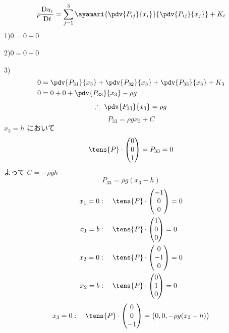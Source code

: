 \[ \rho\frac{\mathrm{D}u_{i}}{\mathrm{D}t}=\sum_{j=1}^{3}\ayamari{\pdv{P_{ij}}{x_{i}}}{\pdv{P_{ij}}{x_{j}}}+K_{i} \]
1)\enspace $0=0+0$

2)\enspace $0=0+0$

3)
\begin{align*}
0&=\pdv{P_{31}}{x_{3}}+\pdv{P_{32}}{x_{3}}+\pdv{P_{33}}{x_{3}}+K_{3}\\
0&=0+0+\pdv{P_{33}}{x_{3}}-\rho g
\end{align*}
\[ \therefore\ \pdv{P_{33}}{x_{3}}=\rho g \]
\[ P_{33}=\rho gx_{3}+C \]
$x_{3}=h$ において
\[ \tens{P}\cdot\begin{pmatrix}0\\0\\1\end{pmatrix}=P_{33}=0 \]
よって $C=-\rho gh$
\[ P_{33}=\rho g(x_{3}-h) \]
\begin{align*}
x_{1}=0&:\quad\tens{P}\cdot\begin{pmatrix}-1\\0\\0\end{pmatrix}=0\\
x_{1}=b&:\quad\tens{P}\cdot\begin{pmatrix}1\\0\\0\end{pmatrix}=0\\
x_{2}=0&:\quad\tens{P}\cdot\begin{pmatrix}0\\-1\\0\end{pmatrix}=0\\
x_{2}=b&:\quad\tens{P}\cdot\begin{pmatrix}0\\1\\0\end{pmatrix}=0
\end{align*}
\[ x_{3}=0:\quad\tens{P}\cdot\begin{pmatrix}0\\0\\-1\end{pmatrix}=\bigl(0,0,-\rho g(x_{3}-h)\bigr) \]
